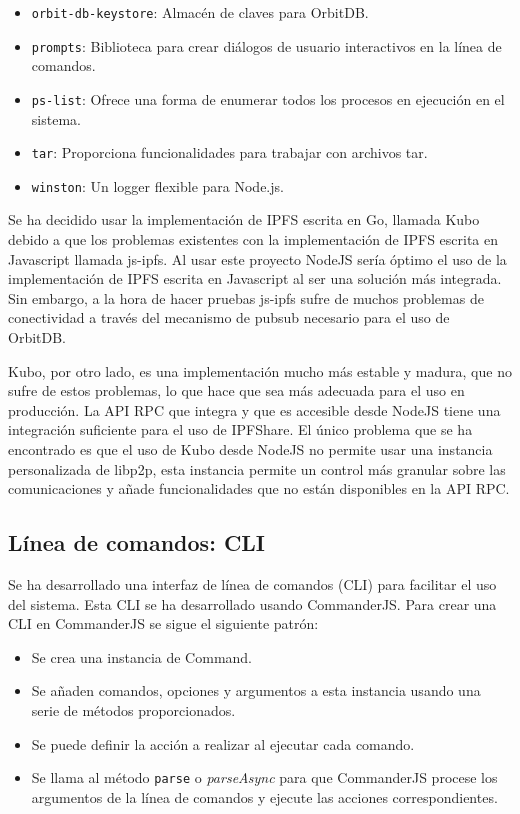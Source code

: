 \begin{itemize}[noitemsep,after=\vspace{-0.4\baselineskip}]
\begin{itemize}[noitemsep]
          \item \texttt{orbit-db-keystore}: Almacén de claves para OrbitDB.
          \item \texttt{prompts}: Biblioteca para crear diálogos de usuario interactivos en la línea de comandos.
          \item \texttt{ps-list}: Ofrece una forma de enumerar todos los procesos en ejecución en el sistema.
          \item \texttt{tar}: Proporciona funcionalidades para trabajar con archivos tar.
          \item \texttt{winston}: Un logger flexible para Node.js.
        \end{itemize}
\end{itemize}
Se ha decidido usar la implementación de IPFS escrita en Go, llamada Kubo debido a que los problemas existentes con la implementación de IPFS escrita en Javascript llamada js-ipfs.
Al usar este proyecto NodeJS sería óptimo el uso de la implementación de IPFS escrita en Javascript al ser una solución más integrada. Sin embargo, a la hora de hacer
pruebas js-ipfs sufre de muchos problemas de conectividad a través del mecanismo de pubsub necesario para el uso de OrbitDB.

Kubo, por otro lado, es una implementación mucho más estable y madura, que no sufre de estos problemas, lo que hace que sea más adecuada para el uso en producción. La API
RPC que integra y que es accesible desde NodeJS tiene una integración suficiente para el uso de IPFShare. El único problema que se ha encontrado es que el uso de Kubo desde NodeJS no permite usar una instancia personalizada de libp2p, esta instancia permite un control más granular sobre las comunicaciones y añade funcionalidades que no están disponibles en la API RPC.

\subsection{Línea de comandos: CLI}\label{sssect:cli}
Se ha desarrollado una interfaz de línea de comandos (CLI) para facilitar el uso del sistema. Esta CLI se ha desarrollado usando CommanderJS.
Para crear una CLI en CommanderJS se sigue el siguiente patrón:
\begin{itemize}[noitemsep,after=\vspace{-0.4\baselineskip}]
  \item Se crea una instancia de Command.
  \item Se añaden comandos, opciones y argumentos a esta instancia usando una serie de métodos proporcionados.
  \item Se puede definir la acción a realizar al ejecutar cada comando.
  \item Se llama al método \texttt{parse} o \textit{parseAsync} para que CommanderJS procese los argumentos de la línea de comandos y ejecute las acciones correspondientes.
\end{itemize}

